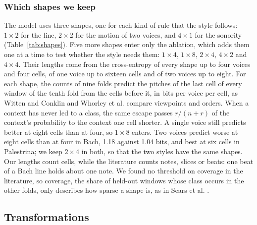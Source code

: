 \subsubsection{Which shapes we keep}
The model uses three shapes, one for each kind of rule that the style follows: $1 \times 2$ for the line, $2 \times 2$ for the motion of two voices, and $4 \times 1$ for the sonority (Table~\ref{tab:shapes}). Five more shapes enter only the ablation, which adds them one at a time to test whether the style needs them: $1 \times 4$, $1 \times 8$, $2 \times 4$, $4 \times 2$ and $4 \times 4$. Their lengths come from the cross-entropy of every shape up to four voices and four cells, of one voice up to sixteen cells and of two voices up to eight. For each shape, the counts of nine folds predict the pitches of the last cell of every window of the tenth fold from the cells before it, in bits per voice per cell, as Witten and Conklin \cite{witten1993} and Whorley et al. \cite{whorley2013} compare viewpoints and orders. When a context has never led to a class, the same escape passes $r/(n+r)$ of the context's probability to the context one cell shorter. A single voice still predicts better at eight cells than at four, so $1 \times 8$ enters. Two voices predict worse at eight cells than at four in Bach, 1.18 against 1.04 bits, and best at six cells in Palestrina; we keep $2 \times 4$ in both, so that the two styles have the same shapes. Our lengths count cells, while the literature counts notes, slices or beats: one beat of a Bach line holds about one note. We found no threshold on coverage in the literature, so coverage, the share of held-out windows whose class occurs in the other folds, only describes how sparse a shape is, as in Sears et al. \cite{sears2017}.

\subsection{Transformations}
\label{sec:transformations}

